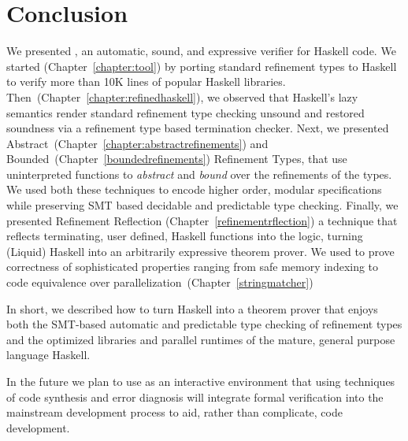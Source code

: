 \chapter{Conclusion}\label{chapter:conclusion}

We presented \toolname, an automatic, sound, and expressive verifier for Haskell code. 
%
We started (Chapter~\ref{chapter:tool}) by porting standard refinement types 
to Haskell to verify more than 10K lines of popular Haskell libraries. 
%
Then~(Chapter~\ref{chapter:refinedhaskell}), we observed that Haskell's 
lazy semantics render standard refinement type checking unsound
and restored soundness via a refinement type based termination checker.
%
Next, we presented Abstract~(Chapter~\ref{chapter:abstractrefinements}) 
and Bounded~(Chapter~\ref{boundedrefinements}) Refinement Types, 
that use uninterpreted functions to 
\textit{abstract} and \textit{bound} over the refinements of the types. 
We used both these techniques to encode higher order, modular specifications
while preserving SMT based decidable and predictable type checking. 
%
Finally, we presented Refinement Reflection (Chapter~\ref{refinementrflection})
a technique that reflects terminating, user defined, 
Haskell functions into the logic, 
turning (Liquid) Haskell into an arbitrarily expressive 
theorem prover. 
%
We used \toolname to prove correctness 
of sophisticated properties ranging from 
safe memory indexing to code equivalence over parallelization~(Chapter~\ref{stringmatcher})

In short, we described how to turn Haskell into a theorem prover
that enjoys both 
the SMT-based automatic and predictable type checking
of refinement types
and 
the optimized libraries and parallel runtimes of 
the mature, general purpose language Haskell.

In the future we plan to use \toolname as an interactive environment 
that using techniques of code synthesis and error diagnosis 
will integrate formal verification into the mainstream development process 
to aid, rather than complicate, code development.




